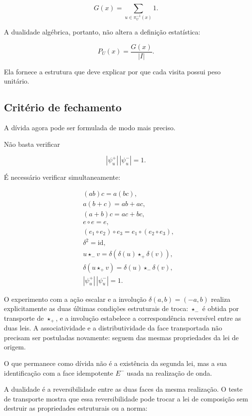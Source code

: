 \documentclass[11pt,a4paper]{article}
\begin{document}
$$
G(x)=\sum_{u\in\pi_U^{-1}(x)}1.
$$

A dualidade algébrica, portanto, não altera a definição estatística:

$$
\boxed{
P_U(x)=\frac{G(x)}{|I|}.
}
$$

Ela fornece a estrutura que deve explicar por que cada visita possui peso
unitário.

\subsection{Critério de fechamento}

A dívida agora pode ser formulada de modo mais preciso.

Não basta verificar

$$
|\psi_u^+|\,|\psi_u^-|=1.
$$

É necessário verificar simultaneamente:

$$
\boxed{
\begin{aligned}
&(ab)c=a(bc),\\
&a(b+c)=ab+ac,\\
&(a+b)c=ac+bc,\\
&e\circ e=e,\\
&(e_1\circ e_2)\circ e_3
=
 e_1\circ(e_2\circ e_3),\\
&\delta^2=\mathrm{id},\\
&u\star_-v
=
\delta\!\left(\delta(u)\star_+\delta(v)\right),\\
&\delta(u\star_+v)
=
\delta(u)\star_-\delta(v),\\
&|\psi_u^+|\,|\psi_u^-|=1.
\end{aligned}
}
$$

O experimento com a ação escalar e a involução
\(\delta(a,b)=(-a,b)\) realiza explicitamente as duas últimas condições
estruturais de troca: \(\star_-\) é obtida por transporte de
\(\star_+\), e a involução estabelece a correspondência reversível entre
as duas leis. A associatividade e a distributividade da face transportada
não precisam ser postuladas novamente: seguem das mesmas propriedades
da lei de origem.

O que permanece como dívida não é a existência da segunda lei, mas a sua
identificação com a face idempotente \(E^-\) usada na realização de onda.

A dualidade é a reversibilidade entre as duas faces da mesma realização.
O teste de transporte mostra que essa reversibilidade pode trocar a lei
de composição sem destruir as propriedades estruturais ou a norma:
\end{document}
